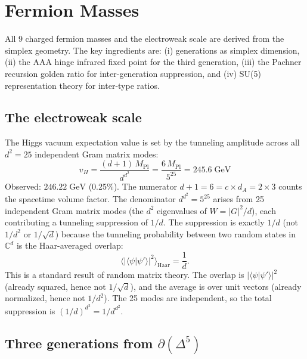 \section{Fermion Masses}
\label{ch:masses}

All 9 charged fermion masses and the electroweak scale are derived from the simplex geometry. The key ingredients are: (i) generations as simplex dimension, (ii) the AAA hinge infrared fixed point for the third generation, (iii) the Pachner recursion golden ratio for inter-generation suppression, and (iv) SU(5) representation theory for inter-type ratios.

\subsection{The electroweak scale}

The Higgs vacuum expectation value is set by the tunneling amplitude across all $d^2 = 25$ independent Gram matrix modes:
\begin{equation}
\boxed{v_H = \frac{(d+1)\,M_\text{Pl}}{d^{d^2}} = \frac{6\,M_\text{Pl}}{5^{25}} = 245.6\;\text{GeV}}
\end{equation}
Observed: $246.22\;\text{GeV}$ (0.25\%). The numerator $d + 1 = 6 = c \times d_A = 2 \times 3$ counts the spacetime volume factor. The denominator $d^{d^2} = 5^{25}$ arises from 25 independent Gram matrix modes (the $d^2$ eigenvalues of $W = |G|^2/d$), each contributing a tunneling suppression of $1/d$. The suppression is exactly $1/d$ (not $1/d^2$ or $1/\sqrt{d}$) because the tunneling probability between two random states in $\mathbb{C}^d$ is the Haar-averaged overlap:
\begin{equation}
\langle|\langle\psi|\psi'\rangle|^2\rangle_\text{Haar} = \frac{1}{d}.
\end{equation}
This is a standard result of random matrix theory. The overlap is $|\langle\psi|\psi'\rangle|^2$ (already squared, hence not $1/\sqrt{d}$), and the average is over unit vectors (already normalized, hence not $1/d^2$). The 25 modes are independent, so the total suppression is $(1/d)^{d^2} = 1/d^{d^2}$.

\subsection{Three generations from $\partial(\Delta^5)$}
\label{sec:three_gen}

